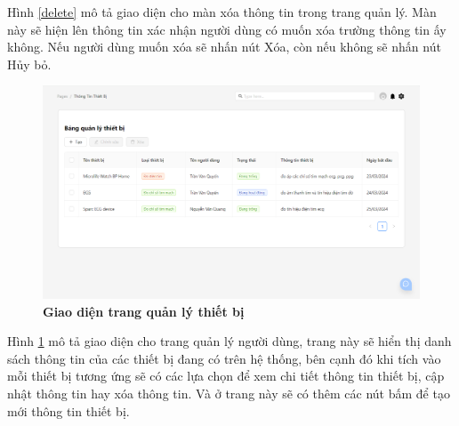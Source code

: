 Hình \ref{delete} mô tả giao diện cho màn xóa thông tin trong trang quản lý. Màn này sẽ hiện lên thông tin xác nhận người dùng có muốn 
xóa trường thông tin ấy không. Nếu người dùng muốn xóa sẽ nhấn nút Xóa, còn nếu không sẽ nhấn nút Hủy bỏ.

\begin{figure}[H]
  \centering
  \includegraphics[scale=0.5]{Images/server/webUI/deviceTable.png}
  \caption[Giao diện trang quản lý thiết bị]{\bfseries \fontsize{12pt}{0pt}\selectfont Giao diện trang quản lý thiết bị}
  \label{deviceTable} %
\end{figure}

Hình \ref{deviceTable} mô tả giao diện cho trang quản lý người dùng, trang này sẽ hiển thị danh sách
thông tin của các thiết bị đang có trên hệ thống, bên cạnh đó khi tích vào mỗi thiết bị tương ứng sẽ 
có các lựa chọn để xem chi tiết thông tin thiết bị, cập nhật thông
tin hay xóa thông tin. Và ở trang này sẽ có thêm các nút bấm để tạo mới thông tin thiết bị.

